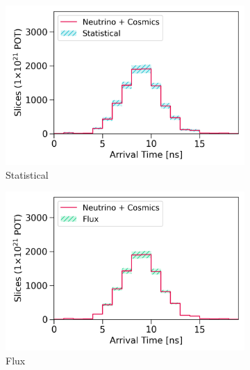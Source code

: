 \begin{figure}[htbp!]
        \begin{subfigure}[b]{0.495\textwidth}   
            \centering 
            \includegraphics[width=\textwidth]{bkg_statistics_error}
            \caption{Statistical}%
            \label{fig:bkg_stat}
        \end{subfigure}
        \hfill
        \begin{subfigure}[b]{0.495\textwidth}   
            \centering 
            \includegraphics[width=\textwidth]{bkg_flx_error}
            \caption{Flux}%
            \label{fig:bkg_flux}
        \end{subfigure}
        \centering
        \begin{subfigure}[b]{0.495\textwidth}   
            \centering 

\end{subfigure}
\end{figure}
